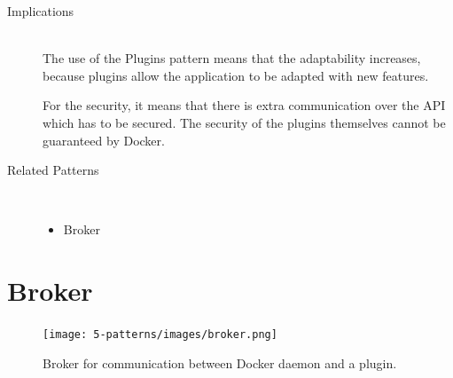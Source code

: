 \begin{description}
\item [Implications]~\\
The use of the Plugins pattern means that the adaptability increases, because plugins allow the application to be adapted with new features.

For the security, it means that there is extra communication over the API which has to be secured. The security of the plugins themselves cannot be guaranteed by Docker.

\item [Related Patterns]~
\begin{itemize}
\item Broker
\end{itemize}
\end{description}

\section{Broker}
\begin{figure}[H]
\centering
\texttt{[image: 5-patterns/images/broker.png]}
\caption{Broker for communication between Docker daemon and a plugin.}
\label{fig:broker-pattern}
\end{figure}

